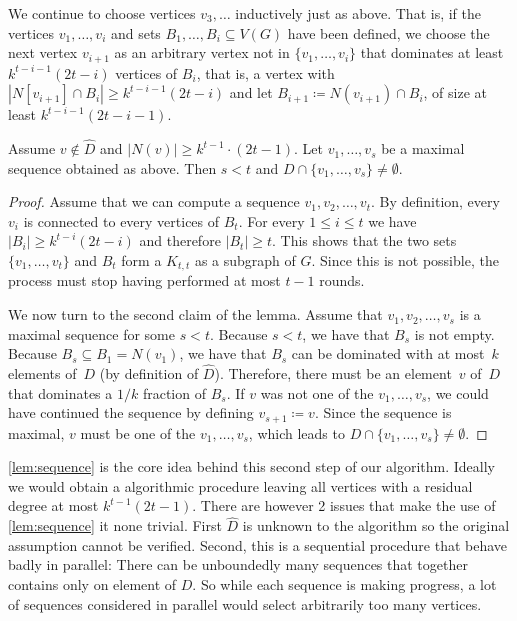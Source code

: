 We continue to choose vertices $v_3,\ldots$ inductively
just as above. That is, if the vertices $v_1,\ldots,v_i$ and sets
$B_1,\ldots, B_i\subseteq V(G)$ have been defined, we choose
the next vertex $v_{i+1}$ as an arbitrary vertex not in $\{v_1,\ldots,
v_i\}$ that dominates
at least $k^{t-i-1}(2t-i)$ vertices of $B_i$, that is, a vertex with
$|N[v_{i+1}]\cap B_i| \ge k^{t-i-1}(2t-i)$ and let
$B_{i+1}\coloneqq N(v_{i+1})\cap B_i$, of size at least
$k^{t-i-1}(2t-i-1)$.



\begin{lemma}\label{lem:sequence}
  Assume $v\not\in\hat D$ and $|N(v)|\geq k^{t-1}\cdot (2t-1)$.
  Let $v_1,\ldots, v_s$ be a maximal sequence obtained as above.
  Then $s<t$ and $D\cap \{v_1,\ldots, v_s\}\neq \emptyset$.
\end{lemma}
\begin{proof}
  Assume that we can compute a sequence $v_1,v_2,\ldots,v_t$. By definition,
  every $v_i$ is connected to every vertices of $B_t$.
  For every $1\leq i\leq t$ we have $|B_i|\geq k^{t-i}(2t-i)$
  and therefore
  $|B_t|\ge t$. This shows that the two sets
  $\{v_1,\ldots,v_t\}$ and $B_t$ form a $K_{t,t}$ as a subgraph of $G$.
  Since this is not possible, the process must stop having performed at
  most $t-1$ rounds.

  We now turn to the second claim of the lemma. Assume that
  $v_1,v_2,\ldots,v_s$ is a maximal sequence for some $s < t$.
  Because $s <t$,
  we have that $B_s$ is not empty. Because $B_s \subseteq B_1 = N(v_1)$, we have
  that $B_s$ can be dominated with at most~$k$ elements of~$D$
  (by definition of $\hat{D}$).
  Therefore, there must be an element~$v$ of~$D$ that dominates a $1/k$
  fraction of $B_s$. If $v$ was not one of the $v_1,\ldots,v_s$, we could have
  continued the
  sequence by defining $v_{s+1} \coloneqq v$.
  Since the sequence is maximal, $v$ must be one of the $v_1,\ldots,v_s$,
  which leads to $D\cap \{v_1,\ldots, v_s\}\neq\emptyset$.
\end{proof}

\cref{lem:sequence} is the core idea behind this second step of our algorithm.
Ideally we would obtain a algorithmic procedure leaving all vertices with a
residual degree at most $k^{t-1}(2t-1)$.
There are however 2 issues that make the use of \cref{lem:sequence} it none
trivial. First $\hat D$ is unknown to the algorithm so the original assumption
cannot be verified. Second, this is a sequential procedure that behave badly in
parallel: There can be unboundedly many sequences that together contains only
on element of $D$. So while each sequence is making progress, a lot of sequences
considered in parallel would select arbitrarily too many vertices.

